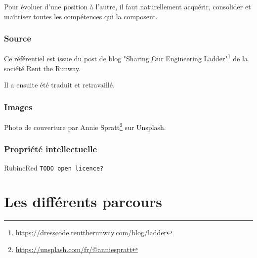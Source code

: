 \documentclass[a4paper, french, openany, 12pt]{book}
\newcommand{\fullwidthimage}[1]{
  \begin{center}
    \makebox[\textwidth]{\texttt{[image: \#1]}}
  \end{center}
}
\newcommand{\todo}[1]{
  \begin{color}{RubineRed}
    \texttt{TODO {#1}}
  \end{color}
}
\begin{document}
\begin{multicols}{2}
  Pour évoluer d'une position à l'autre, il faut naturellement acquérir, consolider et maîtriser toutes les compétences
  qui la composent.
  
  \section*{Source}
  
  Ce référentiel est issue du post de blog 
  "Sharing Our Engineering Ladder"\footnote{\url{https://dresscode.renttherunway.com/blog/ladder}}
  de la société Rent the Runway.
  
  Il a ensuite été traduit et retravaillé.
  
  \section*{Images}
  
  Photo de couverture par Annie Spratt\footnote{\url{https://unsplash.com/fr/@anniespratt}} sur Unsplash.
  
  \section*{Propriété intellectuelle}
  
  \todo{open licence?}
  
\end{multicols}
  
\mainmatter

\part{Les différents parcours}

\fullwidthimage{images/tracks.png}
\end{document}
